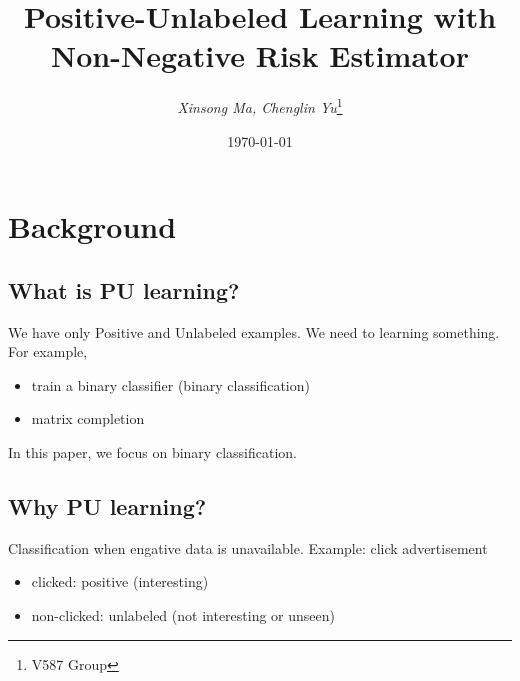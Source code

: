 \documentclass[12pt]{article}
\title{Positive-Unlabeled Learning with Non-Negative Risk Estimator}
\author{\textit{Xinsong Ma, Chenglin Yu}\footnote{V587 Group}}
\date{\today}
\theoremstyle{definition}
\begin{document}
	
\maketitle

\tableofcontents
\section{Background}
\subsection{What is PU learning?}
We have only Positive and Unlabeled examples. We need to learning something. For example, 
\begin{itemize}
		\item train a binary classifier (binary classification)
		\item matrix completion
\end{itemize} 

In this paper, we focus on binary classification. 

\subsection{Why PU learning?}
Classification when engative data is unavailable. 
Example: click advertisement
\begin{itemize}
	\item clicked: positive (interesting)
	\item non-clicked: unlabeled (not interesting or unseen)
\end{itemize}
\end{document}
